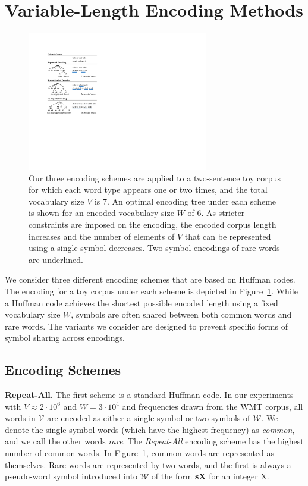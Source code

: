 \section{Variable-Length Encoding Methods}
\label{sec:encoding}

\begin{figure}[t]
\includegraphics[width=3.1in]{images/examples}
\caption{Our three encoding schemes are applied to a two-sentence toy corpus
for which each word type appears one or two times, and the total vocabulary
size $V$ is 7. An optimal encoding tree under each scheme is shown for an
encoded vocabulary size $W$ of 6. As stricter constraints are imposed on the
encoding, the encoded corpus length increases and the number of elements of $V$
that can be represented using a single symbol decreases. Two-symbol encodings
of rare words are underlined.}
\label{fig:examples}
\end{figure}

We consider three different encoding schemes that are based on Huffman codes.
The encoding for a toy corpus under each scheme is depicted in
Figure~\ref{fig:examples}. While a Huffman code achieves the shortest possible
encoded length using a fixed vocabulary size $W$, symbols are often shared
between both common words and rare words. The variants we
consider are designed to prevent specific forms of symbol sharing across encodings.

\subsection{Encoding Schemes}

\noindent\textbf{Repeat-All.}
The first scheme is a standard Huffman code. In our experiments with
$V\approx2\cdot10^6$ and $W=3\cdot10^4$ and frequencies drawn from the WMT
corpus, all words in $\mathcal{V}$ are encoded as either a single symbol or two
symbols of $\mathcal{W}$. We denote the single-symbol words (which have the
highest frequency) as \emph{common}, and we call the other words \emph{rare}.
The \emph{Repeat-All} encoding scheme has the highest number of common words.
In Figure~\ref{fig:examples}, common words are represented as themselves. Rare
words are represented by two words, and the first is always a pseudo-word
symbol introduced into $\mathcal{W}$ of the form \textbf{sX} for an integer X.

